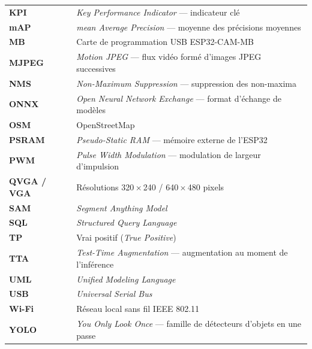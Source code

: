 \begin{center}
\begin{longtable}{>{\bfseries}p{2.6cm} p{12cm}}
KPI    & \textit{Key Performance Indicator} — indicateur clé \\
mAP    & \textit{mean Average Precision} — moyenne des précisions moyennes \\
MB     & Carte de programmation USB ESP32-CAM-MB \\
MJPEG  & \textit{Motion JPEG} — flux vidéo formé d'images JPEG successives \\
NMS    & \textit{Non-Maximum Suppression} — suppression des non-maxima \\
ONNX   & \textit{Open Neural Network Exchange} — format d'échange de modèles \\
OSM    & OpenStreetMap \\
PSRAM  & \textit{Pseudo-Static RAM} — mémoire externe de l'ESP32 \\
PWM    & \textit{Pulse Width Modulation} — modulation de largeur d'impulsion \\
QVGA / VGA & Résolutions 320\,$\times$\,240 / 640\,$\times$\,480 pixels \\
SAM    & \textit{Segment Anything Model} \\
SQL    & \textit{Structured Query Language} \\
TP     & Vrai positif (\textit{True Positive}) \\
TTA    & \textit{Test-Time Augmentation} — augmentation au moment de l'inférence \\
UML    & \textit{Unified Modeling Language} \\
USB    & \textit{Universal Serial Bus} \\
Wi-Fi  & Réseau local sans fil IEEE 802.11 \\
YOLO   & \textit{You Only Look Once} — famille de détecteurs d'objets en une passe \\
\bottomrule
\end{longtable}
\end{center}
